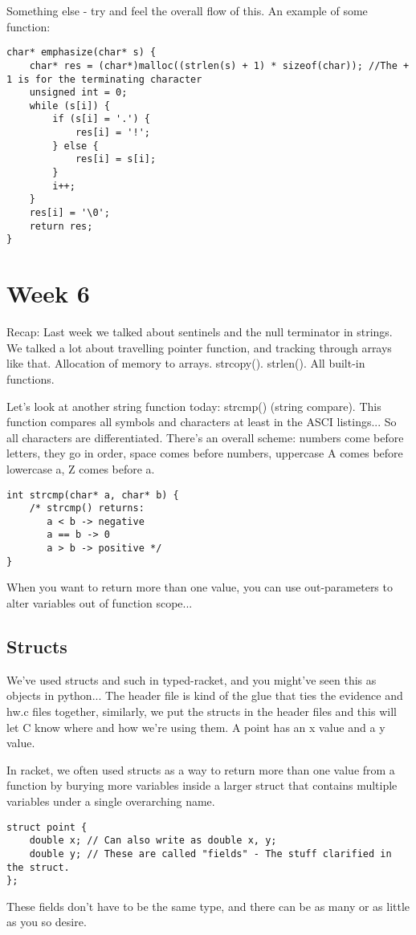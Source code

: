 \documentclass[12pt]{article}
\theoremstyle{definition}
\begin{document}
Something else - try and feel the overall flow of this. An example of some function:
\begin{lstlisting}
char* emphasize(char* s) {
    char* res = (char*)malloc((strlen(s) + 1) * sizeof(char)); //The + 1 is for the terminating character
    unsigned int = 0;
    while (s[i]) {
        if (s[i] = '.') {
            res[i] = '!';
        } else {
            res[i] = s[i];
        }
        i++;
    }
    res[i] = '\0';
    return res;
}
\end{lstlisting}
\section{Week 6}
\note Recap: Last week we talked about sentinels and the null terminator in strings. We talked a lot about travelling pointer function, and tracking through arrays like that. Allocation of memory to arrays. strcopy(). strlen(). All built-in functions.

Let's look at another string function today: strcmp() (string compare). This function compares all symbols and characters at least in the ASCI listings... 
\note So all characters are differentiated. There's an overall scheme: numbers come before letters, they go in order, space comes before numbers, uppercase A comes before lowercase a, Z comes before a. 
\begin{lstlisting}
int strcmp(char* a, char* b) {
    /* strcmp() returns: 
       a < b -> negative
       a == b -> 0
       a > b -> positive */
}
\end{lstlisting}


When you want to return more than one value, you can use out-parameters to alter variables out of function scope...
\subsection{Structs}
We've used structs and such in typed-racket, and you might've seen this as objects in python...
The header file is kind of the glue that ties the evidence and hw.c files together, similarly, we put the structs in the header files and this will let C know where and how we're using them. 
A point has an x value and a y value. 

In racket, we often used structs as a way to return more than one value from a function by burying more variables inside a larger struct that contains multiple variables under a single overarching name. 
\begin{lstlisting}
struct point {
    double x; // Can also write as double x, y;
    double y; // These are called "fields" - The stuff clarified in the struct.
};
\end{lstlisting}
These fields don't have to be the same type, and there can be as many or as little as you so desire. 
\end{document}
